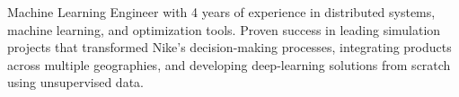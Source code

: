 


\begin{cvparagraph}
Machine Learning Engineer with 4 years of experience in distributed systems, machine learning, and optimization tools. Proven success in leading simulation projects that transformed Nike’s decision-making processes, integrating products across multiple geographies, and developing deep-learning solutions from scratch using unsupervised data.
\end{cvparagraph}